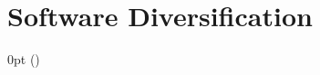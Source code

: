 \section{Software Diversification}
\label{sota:sota}
\def\checkmark{\tikz\fill[scale=0.4](0,.35) -- (.25,0) -- (1,.7) -- (.25,.15) -- cycle;} 

  {\topsep}%
  {\topsep}%
  {\itshape}%
  {0pt}%
  {\bfseries}%
  {}%
  { }%
  {()\textnormal{}}

\def\Gnospace~{G{}}
\theoremstyle{sota}
\newtheorem{goal}{G}
\providecommand*{\definitionautorefname}{\Gnospace}
\newcommand{\goalautorefname}{\Gnospace}


\def\Snospace~{S{}}
\theoremstyle{sota}
\newtheorem{strategy}{S}
\providecommand*{\definitionautorefname}{\Snospace}
\newcommand{\strategyautorefname}{\Snospace}

\def\Unospace~{U{}}
\theoremstyle{sota}
\newtheorem{usage}{U}
\providecommand*{\definitionautorefname}{\Unospace}
\newcommand{\usageautorefname}{\Unospace}









